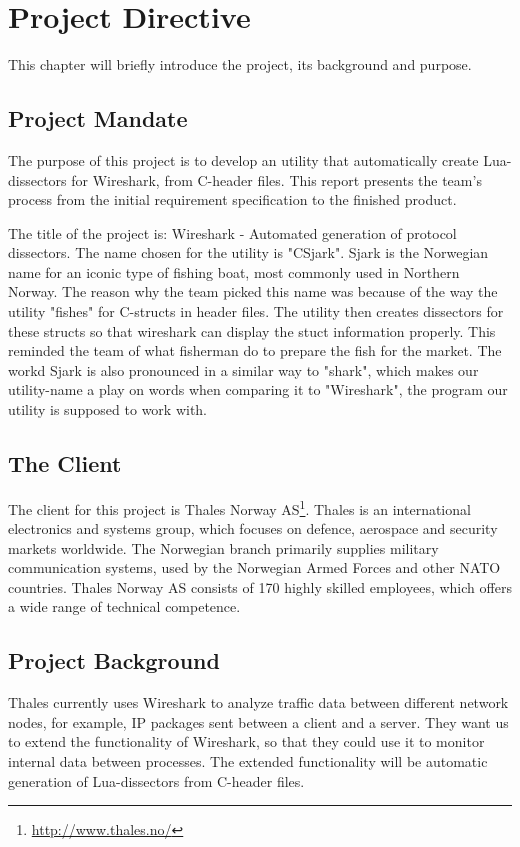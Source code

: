 \chapter{Project Directive}
This chapter will briefly introduce the project, its background and purpose.


\section{Project Mandate}
The purpose of this project is to develop an utility that automatically create Lua-dissectors for Wireshark, from C-header files. This report presents the team’s process from the initial requirement specification to the finished product. 

The title of the project is: Wireshark - Automated generation of protocol dissectors. The name chosen for the utility is "CSjark". Sjark is the Norwegian name for an iconic type of fishing boat, most commonly used in Northern Norway. The reason why the team picked this name was because of the way the utility "fishes" for C-structs in header files. The utility then creates dissectors for these structs so that wireshark can display the stuct information properly. This reminded the team of what fisherman do to prepare the fish for the market. The workd Sjark is also pronounced in a similar way to "shark", which makes our utility-name a play on words when comparing it to "Wireshark", the program our utility is supposed to work with.


\section{The Client}
The client for this project is
Thales Norway AS\footnote{\url{http://www.thales.no/}}. Thales is an
international electronics and systems group, which focuses on defence,
aerospace and security markets worldwide. The Norwegian branch primarily
supplies military communication systems, used by the Norwegian Armed Forces
and other NATO countries. Thales Norway AS consists of 170 highly skilled
employees, which offers a wide range of technical competence.


\section{Project Background}
Thales currently uses Wireshark to analyze traffic data between different network nodes, for example, IP packages sent between a client and a server.
They want us to extend the functionality of Wireshark, so that they could use it to monitor internal data between processes. The extended functionality will be automatic generation of Lua-dissectors from C-header files.

